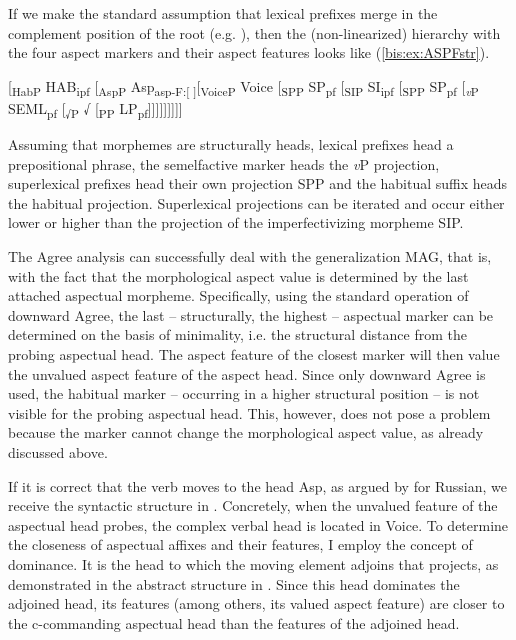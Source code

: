 \documentclass[output=paper]{langscibook}
\begin{document}
If we make the standard assumption that lexical prefixes merge in the complement position of the root (e.g. \citealt{Ramchand2004,Svenonius2004b,Gehrke2008b,Biskup2019}), then the (non-linearized) hierarchy with the four aspect markers and their aspect features looks like (\ref{bis:ex:ASPFstr}).

\ea\label{bis:ex:ASPFstr}	
[\textsubscript{HabP }HAB\textsubscript{ipf} [\textsubscript{AspP} Asp\textsubscript{asp-F:[ ]}[\textsubscript{VoiceP} Voice [\textsubscript{SPP} SP\textsubscript{pf} [\textsubscript{SIP} SI\textsubscript{ipf} [\textsubscript{SPP} SP\textsubscript{pf} [\textsubscript{\textit{v}P} SEML\textsubscript{pf} [\textsubscript{√P} √ [\textsubscript{PP} LP\textsubscript{pf}]]]]]]]]]
\medskip\\
\z

\noindent Assuming that morphemes are structurally heads, lexical prefixes head a prepositional phrase, the semelfactive marker heads the \textit{v}P projection, superlexical prefixes head their own projection SPP and the habitual suffix heads the habitual projection.  Superlexical projections can be iterated and occur either lower or higher than the projection of the imperfectivizing morpheme SIP.

The Agree analysis can successfully deal with the generalization MAG, that is, with the fact that the morphological aspect value is determined by the last attached aspectual morpheme. Specifically, using the standard operation of downward Agree, the last – structurally, the highest – aspectual marker can be determined on the basis of minimality, i.e. the structural distance from the probing aspectual head. The aspect feature of the closest marker will then value the unvalued aspect feature of the aspect head. Since only downward Agree is used, the habitual marker – occurring in a higher structural position – is not visible for the probing aspectual head. This, however, does not pose a problem because the marker cannot change the morphological aspect value, as already discussed above.

If it is correct that the verb moves to the head Asp, as argued by \citet{Gribanova2013,Gribanova2015} for Russian, we receive the syntactic structure in . Concretely, when the unvalued feature of the aspectual head probes, the complex verbal head is located in Voice. To determine the closeness of aspectual affixes and their features, I employ the concept of dominance. It is the head to which the moving element adjoins that projects, as demonstrated in the abstract structure in . Since this head dominates the adjoined head, its features (among others, its valued aspect feature) are closer to the c-commanding aspectual head than the features of the adjoined head.
\end{document}
